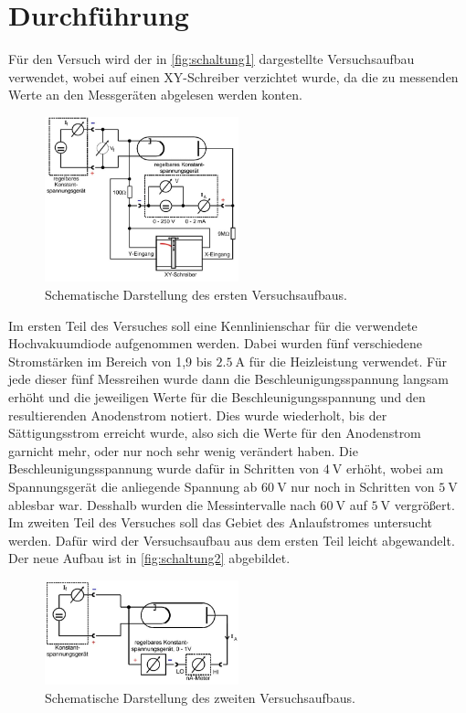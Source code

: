 \section{Durchführung}
\label{sec:Durchführung}
Für den Versuch wird der in \autoref{fig:schaltung1} dargestellte Versuchsaufbau verwendet, wobei auf einen XY-Schreiber verzichtet wurde, da die zu messenden Werte an den
Messgeräten abgelesen werden konten.

\begin{figure}[H]
    \centering
    \includegraphics[width=0.5\textwidth]{data/schaltung1.jpeg}
    \caption{Schematische Darstellung des ersten Versuchsaufbaus\cite{Anleitung504}.}
    \label{fig:schaltung1}
\end{figure}

\noindent
Im ersten Teil des Versuches soll eine Kennlinienschar für die verwendete Hochvakuumdiode aufgenommen werden. Dabei wurden fünf verschiedene Stromstärken im
Bereich von 1,9 bis $\SI{2,5}{\ampere}$ für die Heizleistung verwendet. Für jede dieser fünf Messreihen wurde dann die Beschleunigungsspannung langsam erhöht und die
jeweiligen Werte für die Beschleunigungsspannung und den resultierenden Anodenstrom notiert. Dies wurde wiederholt, bis der Sättigungsstrom erreicht wurde, also sich
die Werte für den Anodenstrom garnicht mehr, oder nur noch sehr wenig verändert haben. Die Beschleunigungsspannung wurde dafür in Schritten von $\SI{4}{\volt}$ erhöht,
wobei am Spannungsgerät die anliegende Spannung ab $\SI{60}{\volt}$ nur noch in Schritten von $\SI{5}{\volt}$ ablesbar war. Desshalb wurden die Messintervalle nach
$\SI{60}{\volt}$ auf $\SI{5}{\volt}$ vergrößert.
\newline\newline
Im zweiten Teil des Versuches soll das Gebiet des Anlaufstromes untersucht werden. Dafür wird der Versuchsaufbau aus dem ersten Teil leicht abgewandelt. Der neue Aufbau
ist in \autoref{fig:schaltung2} abgebildet. 

\begin{figure}[H]
    \centering
    \includegraphics[width=0.5\textwidth]{data/schaltung2.jpeg}
    \caption{Schematische Darstellung des zweiten Versuchsaufbaus\cite{Anleitung504}.}
    \label{fig:schaltung2}
\end{figure}

